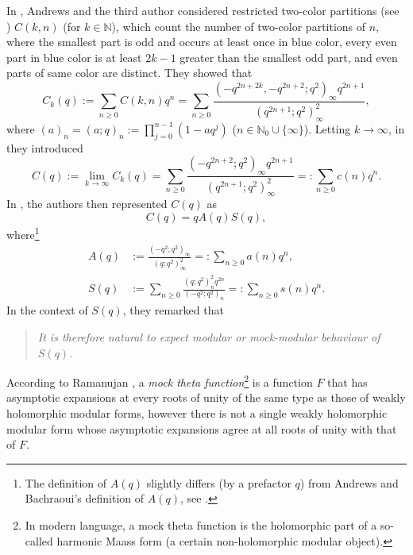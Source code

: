\documentclass[12pt,reqno]{amsart}
\renewcommand{\(}{\left\(}
\renewcommand{\)}{\right\)}
\numberwithin{equation}{section}
\theoremstyle{plain}
\theoremstyle{definition}
\numberwithin{equation}{section}
\begin{document}
 In \cite[(1.1)]{AB}, Andrews and the third author considered restricted two-color partitions (see \cite[Definition 1]{AB}) $C(k,n)$ (for $k\in \mathbb{N}$), which count the number of two-color partitions of $n$, where the smallest part is odd and occurs at least once in blue color, every even part in blue color is at least $2k-1$ greater than the smallest odd part, and even parts of same color are distinct. They showed that
\[
C_k(q):=\sum_{n\ge 0}C\left(k,n\right)q^n=\sum_{n\ge 0}\frac{\left(-q^{2n+2k},-q^{2n+2};q^2\right)_{\infty}q^{2n+1}}{\left(q^{2n+1};q^2\right)^2_{\infty}},
\]  
where $(a)_n=(a;q)_n:=\prod_{j=0}^{n-1}(1-aq^j)$ ($n\in \mathbb{N}_0\cup \{\infty\}$). Letting $k\to \infty$, in \cite[Section 10]{AB} they introduced
\[
C(q):=\lim_{k\to \infty}C_k(q)=\sum_{n\ge 0}\frac{\left(-q^{2n+2};q^2\right)_{\infty}q^{2n+1}}{\left(q^{2n+1};q^2\right)^2_{\infty}}=:\sum_{n\ge 0}c(n)q^n.
\]
In \cite[Remark 3]{AB}, the authors then represented $C(q)$ as 
\begin{equation}\label{C}
C(q)=qA(q)S(q),
\end{equation}
where\footnote{The definition of $A(q)$ slightly differs (by a prefactor $q$) from Andrews and Bachraoui's definition of $A(q)$, see \cite[Remark 3]{AB}.}  %
\begin{align}\label{A}
A(q)&:=\!\frac{\left(-q^2;q^2\right)_{\infty}}{\left(q;q^2\right)^2_{\infty}}\!=:\!\sum_{n\ge 0}a(n)q^n,\\\label{S}
 S(q)&:=\!\sum_{n\ge 0}\frac{\left(q;q^2\right)^2_n q^{2n}}{\left(-q^2;q^2\right)_n}\!=:\!\sum_{n\ge 0}s(n)q^n.
\end{align}
In the context of $S(q)$, they \cite[Remark 2]{AB} remarked that
\begin{quote}
	{\it It is therefore natural to expect modular or mock-modular behaviour of $S(q)$.}	
\end{quote}
 According to Ramanujan \cite{BB}, a {\it mock theta function}\footnote{In modern language, a mock theta function is the holomorphic part of a so-called harmonic Maass form (a certain non-holomorphic modular object).} is a function $F$ that has asymptotic expansions at every roots of unity of the same type as those of weakly holomorphic modular forms, however there is not a single weakly holomorphic modular form whose asymptotic expansions agree at all roots of unity with that of $F$. %
\end{document}
